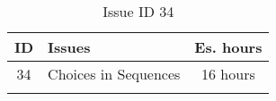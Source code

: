 \begin{longtable} { | c | p{12cm} | c | } 
\hline
	ID 	&	Issues	&		 Es. hours \\\hline
	34 	&	Choices in Sequences	&	16 hours \\\hline
\caption{Issue ID 34}
\label{tab:spr3_choicesinsequences}
\end{longtable}
